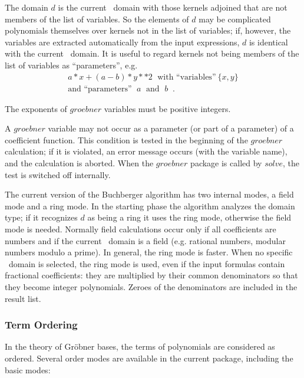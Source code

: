 The domain $d$ is the current \REDUCE \  domain with those kernels
adjoined that are not members of the list of variables. So the
elements of $d$ may be complicated polynomials themselves over
kernels not in the list of variables; if, however, the variables are
extracted automatically from the input expressions, $d$ is identical
with the current \REDUCE \  domain. It is useful to regard kernels not
being members of the list of variables as ``parameters'', e.g.
\[
\begin{array}{c}
 a * x + (a - b) * y**2 \;\mbox{ with ``variables''}\ \{x,y\} \\
\mbox{and ``parameters''  $\;a\;$ and $\;b\;$}\;.
\end{array}
\]

The exponents of $groebner$ variables must be positive integers.

A $groebner$ variable may not occur as a parameter (or part
of a parameter) of a coefficient function. This condition is
tested in the beginning of the $groebner$ calculation; if it is
violated, an error message occurs (with the variable name), and the
calculation is aborted. When the $groebner$ package is called by
$solve$, the test is switched off internally.

The current version of the Buchberger algorithm has two internal
modes, a field mode and a ring mode. In the starting phase the
algorithm analyzes the domain type; if it recognizes $d$ as being a
ring it uses the ring mode, otherwise the field mode is needed.
Normally field calculations occur only if all coefficients are numbers
and if the current \REDUCE \  domain is a field (e.g. rational numbers,
modular numbers modulo a prime). In general, the ring mode is faster.
When no specific
\REDUCE \  domain is selected, the ring mode is used, even if the input
formulas contain fractional coefficients: they are multiplied by their
common denominators so that they become integer polynomials. Zeroes of the
denominators are included in the result list.

\subsubsection{Term Ordering} \par
In the theory of Gr\"obner bases, the terms of polynomials are
considered as ordered. Several order modes are available in
the current package, including the basic modes:
 

